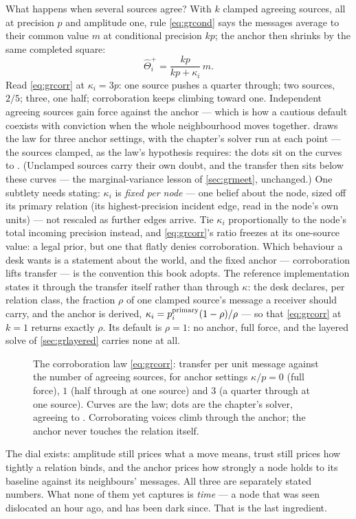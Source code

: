 What happens when several sources agree?  With $k$ clamped agreeing
sources, all at precision $p$ and amplitude one, rule
\cref{eq:grcond} says the messages average to their common value $m$
at conditional precision $kp$; the anchor then shrinks by the same
completed square:
\begin{equation}
\hat\Theta^{+}_i=\frac{kp}{kp+\kappa_i}\,m .
\label{eq:grcorr}
\end{equation}
Read \cref{eq:grcorr} at $\kappa_i=3p$: one source pushes a quarter
through; two sources, $2/5$; three, one half; corroboration keeps
climbing toward one.  Independent agreeing sources gain force
against the anchor --- which is how a cautious default coexists with
conviction when the whole neighbourhood moves together.
 draws the law for three anchor settings, with the
chapter's solver run at each point --- the sources clamped, as the
law's hypothesis requires: the dots sit on the curves to
\MacGrAnchorLawGap.  (Unclamped sources carry their own doubt, and
the transfer then sits below these curves --- the marginal-variance
lesson of \cref{sec:grmeet}, unchanged.)  One subtlety needs stating:
$\kappa_i$ is \emph{fixed per node} --- one belief about the node,
sized off its primary relation (its highest-precision incident edge,
read in the node's own units) --- not rescaled as further edges
arrive.  Tie $\kappa_i$ proportionally to the node's total incoming
precision instead, and \cref{eq:grcorr}'s ratio freezes at its
one-source value: a legal prior, but one that flatly denies
corroboration.  Which behaviour a desk wants is a statement about the
world, and the fixed anchor --- corroboration lifts transfer --- is the
convention this book adopts.  The reference implementation states it
through the transfer itself rather than through $\kappa$: the desk
declares, per relation class, the fraction $\rho$ of one clamped
source's message a receiver should carry, and the anchor is derived,
$\kappa_i=p_i^{\rm primary}(1-\rho)/\rho$ --- so that
\cref{eq:grcorr} at $k=1$ returns exactly $\rho$.  Its default is
$\rho=1$: no anchor, full force, and the layered solve of
\cref{sec:grlayered} carries none at all.

\begin{figure}[htbp]
\centering
{}
\caption{The corroboration law \cref{eq:grcorr}: transfer per unit
message against the number of agreeing sources, for anchor settings
$\kappa/p=0$ (full force), $1$ (half through at one source) and $3$
(a quarter through at one source).  Curves are the law; dots are the
chapter's solver, agreeing to \MacGrAnchorLawGap.  Corroborating
voices climb through the anchor; the anchor never touches the
relation itself.}
\label{fig:granchor}
\end{figure}

The dial exists: amplitude still prices what a move
means, trust still prices how tightly a relation binds, and the
anchor prices how strongly a node holds to its baseline against its
neighbours' messages.  All three are separately stated numbers.
What none of them yet captures is \emph{time} --- a node
that was seen dislocated an hour ago, and has been dark since.  That
is the last ingredient.
